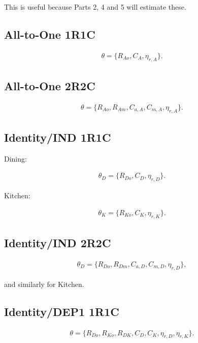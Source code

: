 \documentclass[11pt]{article}
\begin{document}
This is useful because Parts 2, 4 and 5 will estimate these.

\subsection*{All-to-One 1R1C}

\begin{align}
\boxed{
\theta=
\{R_{Ao},C_A,\eta_{r,A}\}.
}
\end{align}

\subsection*{All-to-One 2R2C}

\begin{align}
\boxed{
\theta=
\{
R_{Ao},
R_{Am},
C_{a,A},
C_{m,A},
\eta_{r,A}
\}.
}
\end{align}

\subsection*{Identity/IND 1R1C}

Dining:

\begin{align}
\theta_D=
\{R_{Do},C_D,\eta_{r,D}\}.
\end{align}

Kitchen:

\begin{align}
\theta_K=
\{R_{Ko},C_K,\eta_{r,K}\}.
\end{align}

\subsection*{Identity/IND 2R2C}

\begin{align}
\theta_D=
\{
R_{Do},R_{Dm},
C_{a,D},C_{m,D},
\eta_{r,D}
\},
\end{align}

and similarly for Kitchen.

\subsection*{Identity/DEP1 1R1C}

\begin{align}
\boxed{
\theta=
\{
R_{Do},R_{Ko},R_{DK},
C_D,C_K,
\eta_{r,D},\eta_{r,K}
\}.
}
\end{align}
\end{document}
